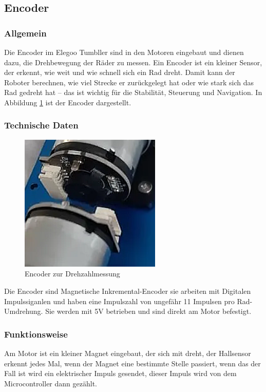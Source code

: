 %
\subsection{Encoder}
%
\subsubsection{Allgemein}
Die Encoder im Elegoo Tumbller sind in den Motoren eingebaut und dienen dazu, die Drehbewegung der Räder zu messen. Ein Encoder ist ein kleiner Sensor, der erkennt, wie weit und wie schnell sich ein Rad dreht. Damit kann der Roboter berechnen, wie viel Strecke er zurückgelegt hat oder wie stark sich das Rad gedreht hat – das ist wichtig für die Stabilität, Steuerung und Navigation. In Abbildung \ref{fig:encoder} ist der Encoder dargestellt.

\subsubsection{Technische Daten}
\begin{figure}[H]
    \centering
    \includegraphics[width=0.6\textwidth]{img/Hardware/encoder.png}
    \caption{Encoder zur Drehzahlmessung}
    \label{fig:encoder}
\end{figure}
Die Encoder sind Magnetische Inkremental-Encoder sie arbeiten mit Digitalen Impulssiganlen und haben eine Impulszahl von ungefähr 11 Impulsen pro Rad-Umdrehung. 
Sie werden mit 5V betrieben und sind direkt am Motor befestigt. 
\subsubsection{Funktionsweise}
Am Motor ist ein kleiner Magnet eingebaut, der sich mit dreht, der Hallsensor erkennt jedes Mal, wenn der Magnet eine bestimmte Stelle passiert, 
wenn das der Fall ist wird ein elektrischer Impuls gesendet, dieser Impuls wird von dem Microcontroller dann gezählt.
